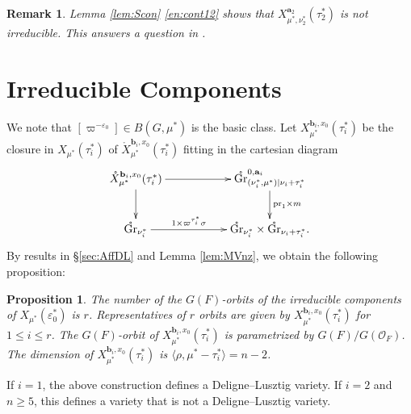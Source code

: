 \documentclass[12pt,a4paper]{article}
\newtheorem{prop}[thm]{Proposition}
\newtheorem{rem}[thm]{Remark}
\DeclareMathOperator{\Gr}{Gr}
\newcommand{\bfa}{\mathbf{a}}
\newcommand{\bfb}{\mathbf{b}}
\newcommand{\cO}{\mathcal{O}}
\begin{document}
\begin{rem}\label{rem:quesXZ}
Lemma \ref{lem:Scon} \ref{en:cont12} shows that 
$X^{\bfa_2}_{\mu^*,\nu^*_2}(\tau_2^*)$ is not irreducible. 
This answers a question in \cite[Remark 4.4.6 (3)]{XiZhCycSh}. 
\end{rem}

\section{Irreducible Components}\label{sec:Irr}

We note that 
$[\varpi^{-\varepsilon_0}] \in B(G , \mu^*)$ is the basic class. 
Let $X_{\mu^*}^{\bfb_i,x_0}(\tau_i^*)$ be 
the closure in $X_{\mu^*}(\tau_i^*)$ of 
$\mathring{X}_{\mu^*}^{\bfb_i,x_0}(\tau_i^*)$ fitting in the cartesian diagram 
 \[
\xymatrix{
\mathring{X}_{\mu^*}^{\bfb_i, x_0}(\tau_i^*)  \ar[rr]^{}  \ar[d] &     &     \mathring{\Gr}^{0,\bfa_i}_{(\nu^*_i, \mu^*) | \nu_i+\tau_i^* }              \ar[d]^{\mathrm{pr}_1 \times m} \\ 
\mathring{\Gr}_{\nu^*_i}  \ar[rr]^-{1 \times \varpi^{\tau^*_i} \sigma }   &  &  \mathring{\Gr}_{\nu^*_i} \times \mathring{\Gr}_{\nu_i+\tau_i^*}  . \\
}\]
By results in \S \ref{sec:AffDL} and Lemma \ref{lem:MVnz}, we obtain the following proposition: 
\begin{prop}\label{prop:irralluni}
The number of the $G(F)$-orbits of the irreducible components of 
$X_{\mu^*}(\varepsilon_0^*)$ is $r$. 
Representatives of $r$ orbits are 
given by $X_{\mu^*}^{\bfb_i,x_0}(\tau_i^*)$ for $1 \leq i \leq r$. 
The $G(F)$-orbit of $X_{\mu^*}^{\bfb_i,x_0}(\tau_i^*)$ is parametrized by 
$G(F)/G(\cO_F)$. 
The dimension of $X_{\mu^*}^{\bfb_i,x_0}(\tau_i^*)$ 
is $\langle \rho, \mu^* - \tau_i^* \rangle=n-2$. 
\end{prop}

If $i = 1$, the above construction defines a Deligne--Lusztig variety. 
If $i = 2$ and $n \geq 5$, 
this defines a variety that is not a Deligne--Lusztig variety.
\end{document}
